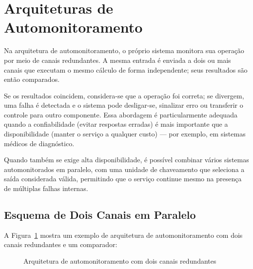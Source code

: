 \documentclass[12pt,a4paper,twoside]{report}
\begin{document}
\section{Arquiteturas de Automonitoramento}

Na arquitetura de automonitoramento, o próprio sistema monitora sua operação
por meio de canais redundantes. A mesma entrada é enviada a dois ou mais
canais que executam o mesmo cálculo de forma independente; seus resultados
são então comparados.

Se os resultados coincidem, considera-se que a operação foi correta; se
divergem, uma falha é detectada e o sistema pode desligar-se, sinalizar
erro ou transferir o controle para outro componente. Essa abordagem é
particularmente adequada quando a confiabilidade (evitar respostas erradas)
é mais importante que a disponibilidade (manter o serviço a qualquer custo)
— por exemplo, em sistemas médicos de diagnóstico.

Quando também se exige alta disponibilidade, é possível combinar vários
sistemas automonitorados em paralelo, com uma unidade de chaveamento que
seleciona a saída considerada válida, permitindo que o serviço continue
mesmo na presença de múltiplas falhas internas.

\subsection{Esquema de Dois Canais em Paralelo}

A Figura~\ref{fig:automonitoramento} mostra um exemplo de arquitetura de
automonitoramento com dois canais redundantes e um comparador:

\begin{figure}[h]
    \centering
    \caption{Arquitetura de automonitoramento com dois canais redundantes}
    \label{fig:automonitoramento}
\end{figure}
\end{document}
